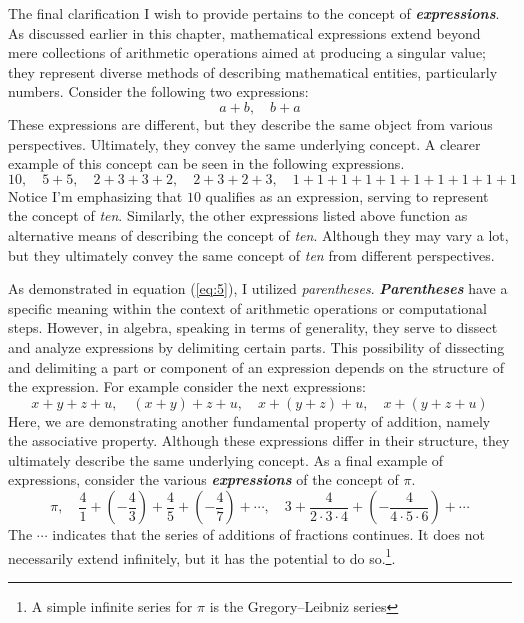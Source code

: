 The final clarification I wish to provide pertains to the concept of \textbf{\textit{expressions}}. As discussed earlier in this chapter, mathematical expressions extend beyond mere collections of arithmetic operations aimed at producing a singular value; they represent diverse methods of describing mathematical entities, particularly numbers. Consider the following two expressions:
\[
  a + b,\quad b + a
\]
These expressions are different, but they describe the same object from various perspectives. Ultimately, they convey the same underlying concept. A clearer example of this concept can be seen in the following expressions.
\begin{equation} \label{eq:6}
  10,\quad 5 + 5,\quad 2 + 3 + 3 + 2,\quad 2 + 3 + 2 + 3,\quad 1 + 1 + 1 + 1 + 1 + 1 + 1 + 1 + 1 + 1
\end{equation}
Notice I'm emphasizing that $10$ qualifies as an expression, serving to represent the concept of \textit{ten}. Similarly, the other expressions listed above function as alternative means of describing the concept of \textit{ten}. Although they may vary a lot, but they ultimately convey the same concept of \textit{ten} from different perspectives.

As demonstrated in equation (\ref{eq:5}), I utilized \textit{parentheses}. \textbf{\textit{Parentheses}} have a specific meaning within the context of arithmetic operations or computational steps. However, in algebra, speaking in terms of generality, they serve to dissect and analyze expressions by delimiting certain parts. This possibility of dissecting and delimiting a part or component of an expression depends on the structure of the expression. For example consider the next expressions:
\[
  x + y + z + u,\quad (x + y) + z + u,\quad x + (y + z) + u,\quad x + (y + z + u)
\]
Here, we are demonstrating another fundamental property of addition, namely the associative property. Although these expressions differ in their structure, they ultimately describe the same underlying concept. As a final example of expressions, consider the various \textit{\textbf{expressions}} of the concept of \textit{$\pi$}.
\begin{equation} \label{eq:12}
  \pi,\quad \frac{4}{1} + ( - \frac{4}{3}) + \frac{4}{5} + (- \frac{4}{7}) + \cdots,\quad 3 + \frac{4}{2 \cdot 3 \cdot 4} + (- \frac{4}{4 \cdot 5 \cdot 6}) + \cdots
\end{equation}
The $\cdots$ indicates that the series of additions of fractions continues. It does not necessarily extend infinitely, but it has the potential to do so.\footnote{A simple infinite series for \textit{$\pi$} is the Gregory–Leibniz series}.

